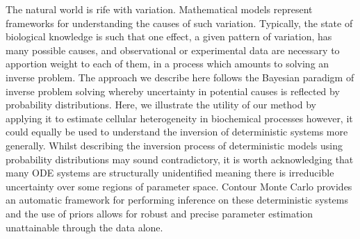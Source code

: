 The natural world is rife with variation. Mathematical models represent frameworks for understanding the causes of such variation. Typically, the state of biological knowledge is such that one effect, a given pattern of variation, has many possible causes, and observational or experimental data are necessary to apportion weight to each of them, in a process which amounts to solving an inverse problem. The approach we describe here follows the Bayesian paradigm of inverse problem solving whereby uncertainty in potential causes is reflected by probability distributions. Here, we illustrate the utility of our method by applying it to estimate cellular heterogeneity in biochemical processes however, it could equally be used to understand the inversion of deterministic systems more generally. Whilst describing the inversion process of deterministic models using probability distributions may sound contradictory, it is worth acknowledging that many ODE systems are structurally unidentified meaning there is irreducible uncertainty over some regions of parameter space. Contour Monte Carlo provides an automatic framework for performing inference on these deterministic systems and the use of priors allows for robust and precise parameter estimation unattainable through the data alone.

